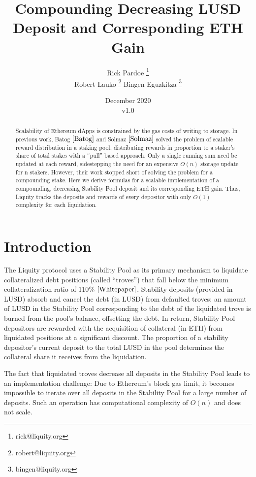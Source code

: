 \documentclass[reqno]{article}
\begin{document}
\title{\textbf{Compounding Decreasing LUSD Deposit and Corresponding ETH Gain}}
\author{Rick Pardoe \thanks{rick@liquity.org}\\[1ex]
  Robert Lauko \thanks{robert@liquity.org} \hspace{2cm}
  Bingen Eguzkitza \thanks{bingen@liquity.org}
}
\date{December 2020\\v1.0}
\maketitle
\begin{abstract}
    Scalability of Ethereum dApps is constrained by the gas costs of writing to storage. 
    In previous work, Batog $\cite{Batog}$ and Solmaz $\cite{Solmaz}$ solved the problem of scalable reward distribution in a staking pool, distributing rewards in proportion to a staker’s share of total stakes with a ``pull'' based approach. Only a single running sum need be updated at each reward, sidestepping the need for an expensive $O(n)$ storage update for n stakers. However, their work stopped short of solving the problem for a compounding stake.
    Here we derive formulas for a scalable implementation of a compounding, decreasing Stability Pool deposit and its corresponding ETH gain. Thus, Liquity tracks the deposits and rewards of every depositor with only $O(1)$ complexity for each liquidation.
\end{abstract}

\section{Introduction}
The Liquity protocol uses a Stability Pool as its primary mechanism to liquidate collateralized debt positions (called ``troves'') that fall below the minimum collateralization ratio of 110$\%$ $\cite{Whitepaper}$. Stability deposits (provided in LUSD) absorb and cancel the debt (in LUSD) from defaulted troves: an amount of LUSD in the Stability Pool corresponding to the debt of the liquidated trove is burned from the pool’s balance, offsetting the debt. In return, Stability Pool depositors are rewarded with the acquisition of collateral (in ETH) from liquidated positions at a significant discount. The proportion of a stability depositor’s current deposit to the total LUSD in the pool determines the collateral share it receives from the liquidation. 

The fact that liquidated troves decrease all deposits in the Stability Pool leads to an implementation challenge: Due to Ethereum's block gas limit, it becomes impossible to iterate over all deposits in the Stability Pool for a large number of deposits. Such an operation has computational complexity of $O(n)$ and does not scale. 
\end{document}
